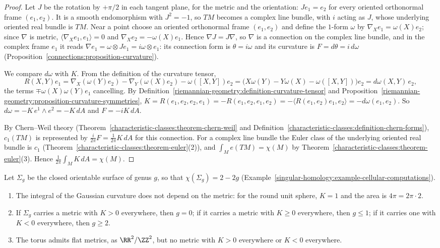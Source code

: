 \begin{proof}
Let $J$ be the rotation by $+\pi/2$ in each tangent plane, for the metric and the orientation: $Je_1 = e_2$ for every oriented orthonormal frame $(e_1, e_2)$. It is a smooth endomorphism with $J^2 = -1$, so $TM$ becomes a
complex line bundle, with $i$ acting as $J$, whose underlying oriented real bundle is $TM$. Near a point choose an oriented orthonormal frame $(e_1, e_2)$ and define the $1$-form $\omega$ by $\nabla_Xe_1 = \omega(X)e_2$; since
$\nabla$ is metric, $\langle\nabla_Xe_1, e_1\rangle = 0$ and $\nabla_Xe_2 = -\omega(X)e_1$. Hence $\nabla J = J\nabla$, so $\nabla$ is a connection on the complex line bundle, and in the complex frame $e_1$ it reads
$\nabla e_1 = \omega \otimes Je_1 = i\omega \otimes e_1$: its connection form is $\theta = i\omega$ and its curvature is $F = d\theta = i\,d\omega$ (Proposition~\ref{connections:proposition-curvature}).

We compare $d\omega$ with $K$. From the definition of the curvature tensor,
\[
R(X, Y)e_1 = \nabla_X(\omega(Y)e_2) - \nabla_Y(\omega(X)e_2) - \omega([X, Y])e_2 = \big(X\omega(Y) - Y\omega(X) - \omega([X, Y])\big)e_2 = d\omega(X, Y)\,e_2,
\]
the terms $\mp\omega(X)\omega(Y)e_1$ cancelling. By Definition~\ref{riemannian-geometry:definition-curvature-tensor} and Proposition~\ref{riemannian-geometry:proposition-curvature-symmetries},
$K = R(e_1, e_2, e_2, e_1) = -R(e_1, e_2, e_1, e_2) = -\langle R(e_1, e_2)e_1, e_2\rangle = -d\omega(e_1, e_2)$. So $d\omega = -K\,e^1 \wedge e^2 = -K\,dA$ and $F = -iK\,dA$.

By Chern--Weil theory (Theorem~\ref{characteristic-classes:theorem-chern-weil} and Definition~\ref{characteristic-classes:definition-chern-forms}), $c_1(TM)$ is represented by $\frac{i}{2\pi}F = \frac{1}{2\pi}K\,dA$ for this connection.
For a complex line bundle the Euler class of the underlying oriented real bundle is $c_1$ (Theorem~\ref{characteristic-classes:theorem-euler}(2)), and $\int_Me(TM) = \chi(M)$ by
Theorem~\ref{characteristic-classes:theorem-euler}(3). Hence $\frac{1}{2\pi}\int_MK\,dA = \chi(M)$.
\end{proof}

\begin{corollary}\label{riemannian-geometry:corollary-gauss-bonnet}
Let $\Sigma_g$ be the closed orientable surface of genus $g$, so that $\chi(\Sigma_g) = 2 - 2g$ (Example~\ref{singular-homology:example-cellular-computations}).
\begin{enumerate}
\item The integral of the Gaussian curvature does not depend on the metric: for the round unit sphere, $K = 1$ and the area is $4\pi = 2\pi \cdot 2$.
\item If $\Sigma_g$ carries a metric with $K > 0$ everywhere, then $g = 0$; if it carries a metric with $K \geq 0$ everywhere, then $g \leq 1$; if it carries one with $K < 0$ everywhere, then $g \geq 2$.
\item The torus admits flat metrics, as $\RR^2/\ZZ^2$, but no metric with $K > 0$ everywhere or $K < 0$ everywhere.
\end{enumerate}
\end{corollary}

